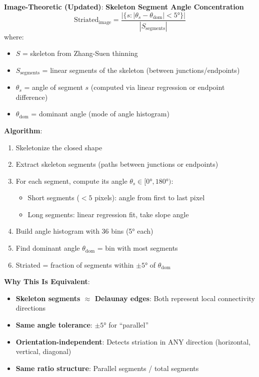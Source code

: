 \documentclass[11pt]{article}
\begin{document}
\textbf{Image-Theoretic (Updated)}: \textbf{Skeleton Segment Angle Concentration}
\begin{equation}
    \text{Striated}_{\text{image}} = \frac{|\{s : |\theta_s - \theta_{\text{dom}}| < 5°\}|}{|S_{\text{segments}}|}
\end{equation}
where:
\begin{itemize}
    \item $S$ = skeleton from Zhang-Suen thinning
    \item $S_{\text{segments}}$ = linear segments of the skeleton (between junctions/endpoints)
    \item $\theta_s$ = angle of segment $s$ (computed via linear regression or endpoint difference)
    \item $\theta_{\text{dom}}$ = dominant angle (mode of angle histogram)
\end{itemize}

\textbf{Algorithm}:
\begin{enumerate}
    \item Skeletonize the closed shape
    \item Extract skeleton segments (paths between junctions or endpoints)
    \item For each segment, compute its angle $\theta_s \in [0°, 180°)$:
        \begin{itemize}
            \item Short segments ($<5$ pixels): angle from first to last pixel
            \item Long segments: linear regression fit, take slope angle
        \end{itemize}
    \item Build angle histogram with 36 bins (5° each)
    \item Find dominant angle $\theta_{\text{dom}}$ = bin with most segments
    \item Striated = fraction of segments within $\pm 5°$ of $\theta_{\text{dom}}$
\end{enumerate}

\textbf{Why This Is Equivalent}:
\begin{itemize}
    \item \textbf{Skeleton segments $\approx$ Delaunay edges}: Both represent local connectivity directions
    \item \textbf{Same angle tolerance}: $\pm 5°$ for ``parallel''
    \item \textbf{Orientation-independent}: Detects striation in ANY direction (horizontal, vertical, diagonal)
    \item \textbf{Same ratio structure}: Parallel segments / total segments
\end{itemize}
\end{document}
